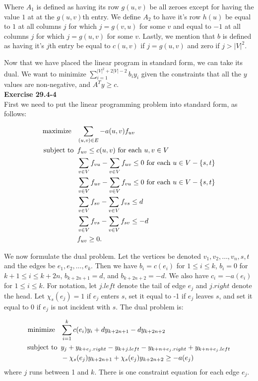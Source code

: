 \documentclass{article}
\begin{document}
Where $A_1$ is defined as having its row $g(u,v)$ be all zeroes except for having the value $1$ at at the $g(u,v)$th entry. We define $A_2$ to have it's row $h(u)$ be equal to $1$ at all columns $j$ for which $j=g(v,u)$ for some $v$ and equal to $-1$ at all columns $j$ for which $j= g(u,v)$ for some $v$. Lastly, we mention that $b$ is defined as having it's $j$th entry be equal to $c(u,v)$ if $j =g(u,v)$ and zero if $j > |V|^2$.

Now that we have placed the linear program in standard form, we can take its dual. We want to minimize $\sum_{i=1}^{|V|^2+2|V|-2} b_i y_i$ given the constraints that all the $y$ values are non-negative, and $A^T y \ge c$.\\

\noindent\textbf{Exercise 29.4-4}\\

First we need to put the linear programming problem into standard form, as follows:

\begin{align*}
\mbox{maximize \,\,\,} & \sum_{(u,v) \in E} -a(u,v)f_{uv}\\
\mbox{subject to \,} & f_{uv} \leq c(u,v) \mbox{ for each } u,v \in V \\
& \sum_{v \in V} f_{vu} - \sum_{v \in V} f_{uv} \leq 0 \mbox{ for each } u \in V - \{s,t\} \\
& \sum_{v \in V} f_{uv} - \sum_{v \in V} f_{vu} \leq 0 \mbox{ for each } u \in V - \{s,t\} \\
& \sum_{v \in V} f_{sv} - \sum_{v \in V} f_{vs} \leq d \\
& \sum_{v \in V} f_{vs} - \sum_{v \in V} f_{sv} \leq -d \\ 
& f_{uv} \geq 0.\\
\end{align*}

We now formulate the dual problem.  Let the vertices be denoted $v_1, v_2, \ldots, v_n, s, t$ and the edges be $e_1, e_2, \ldots, e_k$.  Then we have $b_i = c(e_i)$ for $1 \leq i \leq k$, $b_i = 0$ for $k+1 \leq i \leq k+2n$, $b_{k+2n+1} = d$, and $b_{k+2n+2} = -d$. We also have $c_i = -a(e_i)$ for $1 \leq i \leq k$.  For notation, let $j.left$ denote the tail of edge $e_j$ and $j.right$ denote the head.  Let $\chi_s(e_j) = 1$ if $e_j$ enters $s$, set it equal to -1 if $e_j$ leaves $s$, and set it equal to $0$ if $e_j$ is not incident with $s$.  The dual problem is:

\begin{align*}
\mbox{minimize \,\,\,} & \sum_{i=1}^k c(e_i)y_i + dy_{k+2n+1} - dy_{k+2n+2}\\
\mbox{subject to \,} & y_j + y_{k+e_j.right} - y_{k+j.left} - y_{k+n+e_j.right} + y_{k + n + e_j.left} \\
& - \chi_s(e_j)y_{k+2n+1} + \chi_s(e_j) y_{k+2n+2} \geq -a(e_j)
\end{align*}
where $j$ runs between 1 and $k$.  There is one constraint equation for each edge $e_j$. \\
\end{document}
